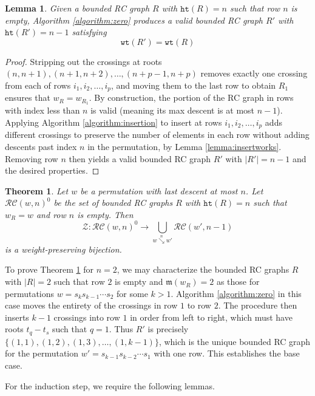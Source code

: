 \documentclass[a4paper,fleqn]{cas-sc}
\newtheorem{lemma}{Lemma}[subsection]
\newtheorem{theorem}{Theorem}[section]
\theoremstyle{definition}
\theoremstyle{remark}
\numberwithin{equation}{subsection}
\newcommand{\downvar}[1]{\stackrel{#1}{\searrow}}
\newcommand{\wof}[1]{w_{#1}}
\newcommand{\wtt}{\mathtt{wt}}
\newcommand{\zeromap}{\mathcal{Z}}
\newcommand{\hr}{\mathtt{ht}}
\newcommand{\maxd}{\mathfrak{m}}
\begin{document}
\begin{lemma}
Given a bounded RC graph $R$ with $\hr(R)=n$ such that row $n$ is empty, Algorithm \ref{algorithm:zero} produces a valid bounded RC graph $R'$ with $\hr(R')=n-1$ satisfying
$$\wtt(R') = \wtt(R)$$
\end{lemma}
\begin{proof}
	Stripping out the crossings at roots $(n, n+1), (n+1, n+2), \ldots, (n + p - 1, n + p)$ removes exactly one crossing from each of rows $i_1, i_2, \ldots, i_p$, and moving them to the last row to obtain $R_1$ ensures that $\wof{R}=\wof{R_1}$. By construction, the portion of the RC graph in rows with index less than $n$ is valid (meaning its max descent is at most $n-1$). Applying Algorithm \ref{algorithm:insertion} to insert at rows $i_1, i_2, \ldots, i_p$ adds different crossings to preserve the number of elements in each row without adding descents past index $n$ in the permutation, by Lemma \ref{lemma:insertworks}. Removing row $n$ then yields a valid bounded RC graph $R'$ with $|R'|=n-1$ and the desired properties. 
\end{proof}



\begin{theorem} \label{theorem:zero_bijection}
Let $w$ be a permutation with last descent at most $n$. Let $\mathcal{RC}(w,n)^0$ be the set of bounded RC graphs $R$ with $\hr(R)=n$ such that $\wof{R}=w$ and row $n$ is empty. Then
$$\zeromap:\mathcal{RC}(w, n)^{0}\to \bigcup_{w\downvar{n} w'}\mathcal{RC}(w', n-1)$$
is a weight-preserving bijection.
\end{theorem}

To prove Theorem \ref{theorem:zero_bijection} for $n=2$, we may characterize the bounded RC graphs $R$ with $|R|=2$ such that row $2$ is empty and $\maxd(\wof{R})=2$ as those for permutations $w=s_k s_{k-1}\cdots s_2$ for some $k>1$. Algorithm \ref{algorithm:zero} in this case moves the entirety of the crossings in row $1$ to row $2$. The procedure then inserts $k-1$ crossings into row $1$ in order from left to right, which must have roots $t_q - t_s$ such that $q=1$. Thus $R'$ is precisely $\{(1,1), (1,2), (1,3), \ldots, (1, k-1)\}$, which is the unique bounded RC graph for the permutation $w' = s_{k-1} s_{k-2}\cdots s_1$ with one row. This establishes the base case.

For the induction step, we require the following lemmas.
\end{document}

